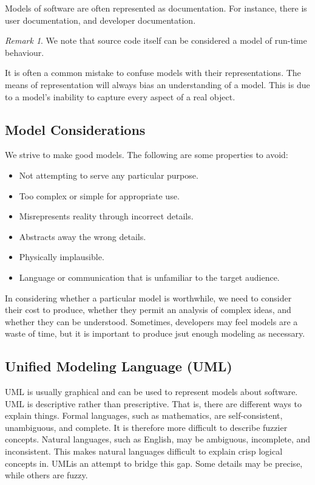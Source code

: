 \documentclass[11pt]{article}
\theoremstyle{plain} %
\theoremstyle{definition}
\theoremstyle{example}
\theoremstyle{remark}
\newtheorem*{remark}{Remark}
\begin{document}
Models of software are often represented as documentation. For instance, there is user documentation, and developer documentation. 

\begin{remark}
We note that source code itself can be considered a model of run-time behaviour. 
\end{remark}

It is often a common mistake to confuse models with their representations. The means of representation will always bias an understanding of a model. This is due to a model's inability to capture every aspect of a real object. 

\subsection{Model Considerations}

We strive to make good models. The following are some properties to avoid:

\begin{itemize}
	\item Not attempting to serve any particular purpose.
	\item Too complex or simple for appropriate use.
	\item Misrepresents reality through incorrect details.
	\item Abstracts away the wrong details.
	\item Physically implausible.
	\item Language or communication that is unfamiliar to the target audience.
\end{itemize}

In considering whether a particular model is worthwhile, we need to consider their cost to produce, whether they permit an analysis of complex ideas, and whether they can be understood. Sometimes, developers may feel models are a waste of time, but it is important to produce jsut enough modeling as necessary.




\subsection{Unified Modeling Language (UML)}

UML is usually graphical and can be used to represent models about software. UML is descriptive rather than prescriptive. That is, there are different ways to explain things. Formal languages, such as mathematics, are self-consistent, unambiguous, and complete. It is therefore more difficult to describe fuzzier concepts. Natural languages, such as English, may be ambiguous, incomplete, and inconsistent. This makes natural languages difficult to explain crisp logical concepts in. UMLis an attempt to bridge this gap. Some details may be precise, while others are fuzzy.
\end{document}

